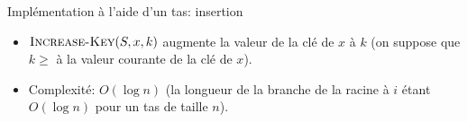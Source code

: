 \begin{frame}{Implémentation à l'aide d'un tas: insertion}
\begin{itemize}
\item $\textnormal{\scshape Increase-Key}(S,x,k)$ augmente la valeur de la clé de $x$
  à $k$ (on suppose que $k\geq$ à la valeur courante de la clé de $x$).

\bigskip

\begin{center}
\begin{small}
\end{small}
\end{center}

\bigskip

\item Complexité: $O(\log n)$ (la longueur de la branche de la racine à $i$ étant $O(\log n)$ pour un tas de taille $n$).
\end{itemize}
\end{frame}

